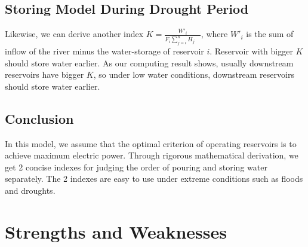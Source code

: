 \documentclass[12pt]{article}%
\begin{document}
\subsection{Storing Model During Drought Period}
Likewise, we can derive another index $K=\frac{W'_{i}}{F_{i} \sum_{j=i}^{n} H_{j}\quad}$, where $W'_{i}$ is the sum of inflow of the river minus the water-storage of reservoir $i$. Reservoir with bigger $K$ should store water earlier. As our computing result shows, usually downstream reservoirs have bigger $K$, so under low water conditions, downstream reservoirs should store water earlier.
\subsection{Conclusion}
In this model, we assume that the optimal criterion of operating reservoirs is to achieve maximum electric power. Through rigorous mathematical derivation, we get 2 concise indexes for judging the order of pouring and storing water separately. The 2 indexes are  easy to use under extreme conditions such as floods and droughts.
\section{Strengths and Weaknesses}
\end{document}
